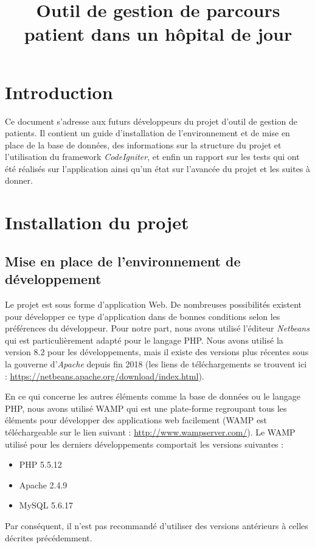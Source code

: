 \documentclass{polytech/polytech}
\title{Outil de gestion de parcours patient dans un hôpital de jour}
\begin{document}
\chapter*{Introduction}

Ce document s'adresse aux futurs développeurs du projet d'outil de gestion de patients. Il contient un guide d'installation de l'environnement et de mise en place de la base de données, des informations sur la structure du projet et l'utilisation du framework \textit{CodeIgniter}, et enfin un rapport sur les tests qui ont été réalisés sur l'application ainsi qu'un état sur l'avancée du projet et les suites à donner. 


\chapter{Installation du projet}


\section{Mise en place de l'environnement de développement}

Le projet est sous forme d'application Web. De nombreuses possibilités existent pour développer ce type d'application dans de bonnes conditions selon les préférences du développeur. Pour notre part, nous avons utilisé l'éditeur \textit{Netbeans} qui est particulièrement adapté pour le langage PHP. Nous avons utilisé la version 8.2 pour les développements, mais il existe des versions plus récentes sous la gouverne d'\textit{Apache} depuis fin 2018 (les liens de téléchargements se trouvent ici : \url{https://netbeans.apache.org/download/index.html}).

En ce qui concerne les autres éléments comme la base de données ou le langage PHP, nous avons utilisé WAMP qui est une plate-forme regroupant tous les éléments pour développer des applications web facilement (WAMP est téléchargeable sur le lien suivant : \url{http://www.wampserver.com/}). Le WAMP utilisé pour les derniers développements comportait les versions suivantes :

\begin{itemize}
	\item PHP 5.5.12
	\item Apache 2.4.9
	\item MySQL 5.6.17
\end{itemize}

Par conséquent, il n'est pas recommandé d'utiliser des versions antérieurs à celles décrites précédemment.
\end{document}
